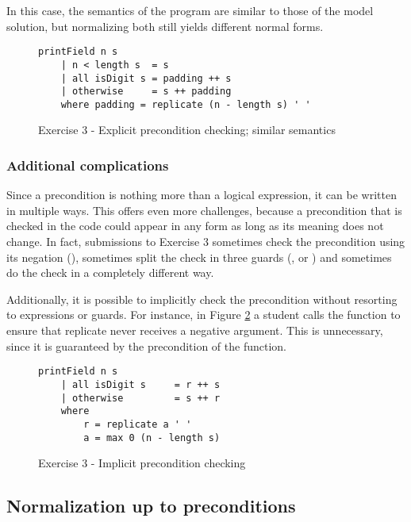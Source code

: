 In this case, the semantics of the program are similar to those of the model solution, but normalizing both still yields different normal forms.

\begin{figure}
\centering
\begin{verbatim}
printField n s
    | n < length s  = s
    | all isDigit s = padding ++ s
    | otherwise     = s ++ padding
    where padding = replicate (n - length s) ' '
\end{verbatim}
\caption{Exercise 3 - Explicit precondition checking; similar semantics}
\label{fig:analysis-precondition-similar-semantics}
\end{figure}

\subsubsection{Additional complications}

Since a precondition is nothing more than a logical expression, it can be written in multiple ways. This offers even more challenges, because a precondition that is checked in the code could appear in any form as long as its meaning does not change. In fact, submissions to Exercise 3 sometimes check the precondition using its negation (), sometimes split the check in three guards (,  or ) and sometimes do the check in a completely different way.

Additionally, it is possible to implicitly check the precondition without resorting to  expressions or guards. For instance, in Figure \ref{fig:ex3-implicit-precondition-checking} a student calls the  function to ensure that replicate never receives a negative argument. This is unnecessary, since it is guaranteed by the precondition of the function.

\begin{figure}
\centering
\begin{verbatim}
printField n s
    | all isDigit s     = r ++ s
    | otherwise         = s ++ r
    where
        r = replicate a ' '
        a = max 0 (n - length s)
\end{verbatim}
\caption{Exercise 3 - Implicit precondition checking}
\label{fig:ex3-implicit-precondition-checking}
\end{figure}

\subsection{Normalization up to preconditions}
\label{sec:analysis-precondition-solution}

